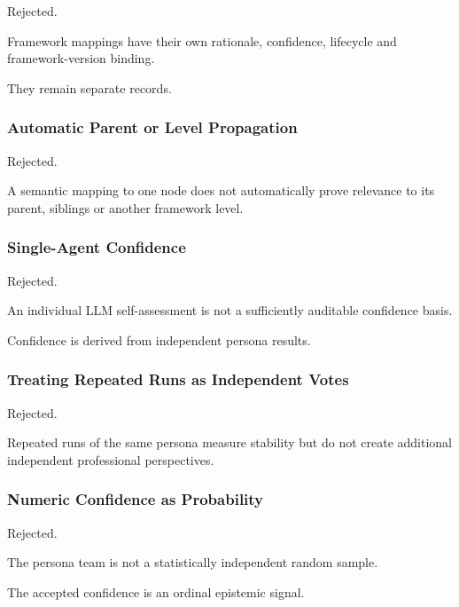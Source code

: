 Rejected.

Framework mappings have their own rationale, confidence, lifecycle and framework-version binding.

They remain separate records.

\hypertarget{automatic-parent-or-level-propagation}{%
\subsubsection{Automatic Parent or Level Propagation}\label{automatic-parent-or-level-propagation}}

Rejected.

A semantic mapping to one node does not automatically prove relevance to its parent, siblings or another framework level.

\hypertarget{single-agent-confidence}{%
\subsubsection{Single-Agent Confidence}\label{single-agent-confidence}}

Rejected.

An individual LLM self-assessment is not a sufficiently auditable confidence basis.

Confidence is derived from independent persona results.

\hypertarget{treating-repeated-runs-as-independent-votes}{%
\subsubsection{Treating Repeated Runs as Independent Votes}\label{treating-repeated-runs-as-independent-votes}}

Rejected.

Repeated runs of the same persona measure stability but do not create additional independent professional perspectives.

\hypertarget{numeric-confidence-as-probability}{%
\subsubsection{Numeric Confidence as Probability}\label{numeric-confidence-as-probability}}

Rejected.

The persona team is not a statistically independent random sample.

The accepted confidence is an ordinal epistemic signal.

